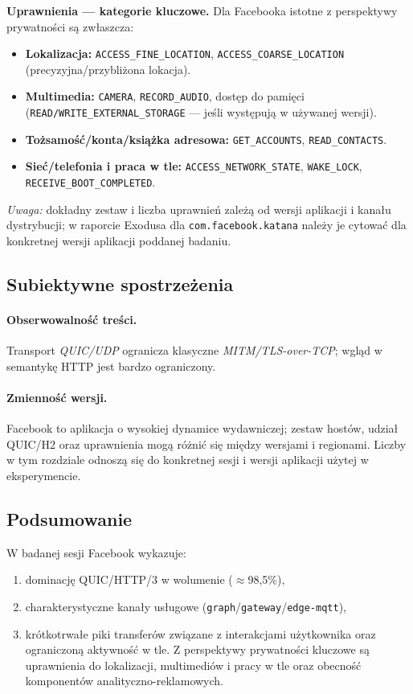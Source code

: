 \textbf{Uprawnienia — kategorie kluczowe.} Dla Facebooka istotne z perspektywy prywatności są zwłaszcza:
\begin{itemize}
  \item \textbf{Lokalizacja:} \texttt{ACCESS\_FINE\_LOCATION}, \texttt{ACCESS\_COARSE\_LOCATION} (precyzyjna/przybliżona lokacja).
  \item \textbf{Multimedia:} \texttt{CAMERA}, \texttt{RECORD\_AUDIO}, dostęp do pamięci (\texttt{READ/WRITE\_EXTERNAL\_STORAGE} — jeśli występują w używanej wersji).
  \item \textbf{Tożsamość/konta/książka adresowa:} \texttt{GET\_ACCOUNTS}, \texttt{READ\_CONTACTS}.
  \item \textbf{Sieć/telefonia i praca w tle:} \texttt{ACCESS\_NETWORK\_STATE}, \texttt{WAKE\_LOCK}, \texttt{RECEIVE\_BOOT\_COMPLETED}.
\end{itemize}
\emph{Uwaga:} dokładny zestaw i liczba uprawnień zależą od wersji aplikacji i kanału dystrybucji; w raporcie Exodusa dla \texttt{com.facebook.katana} należy je cytować dla konkretnej wersji aplikacji poddanej badaniu.

\subsection{Subiektywne spostrzeżenia}
\paragraph{Obserwowalność treści.}
Transport \emph{QUIC/UDP} ogranicza klasyczne \emph{MITM/TLS-over-TCP}; wgląd w semantykę HTTP jest bardzo ograniczony.

\paragraph{Zmienność wersji.}
Facebook to aplikacja o wysokiej dynamice wydawniczej; zestaw hostów, udział QUIC/H2 oraz uprawnienia mogą różnić się między wersjami i regionami. Liczby w tym rozdziale odnoszą się do konkretnej sesji i wersji aplikacji użytej w eksperymencie.

\subsection{Podsumowanie}
W badanej sesji Facebook wykazuje: 
\begin{enumerate}
\item dominację QUIC/HTTP/3 w wolumenie ($\approx$98{,}5\%), 
\item charakterystyczne kanały usługowe (\texttt{graph}/\texttt{gateway}/\texttt{edge-mqtt}), 
\item krótkotrwałe piki transferów związane z interakcjami użytkownika oraz ograniczoną aktywność w tle. Z perspektywy prywatności kluczowe są uprawnienia do lokalizacji, multimediów i pracy w tle oraz obecność komponentów analityczno-reklamowych.
\end{enumerate}